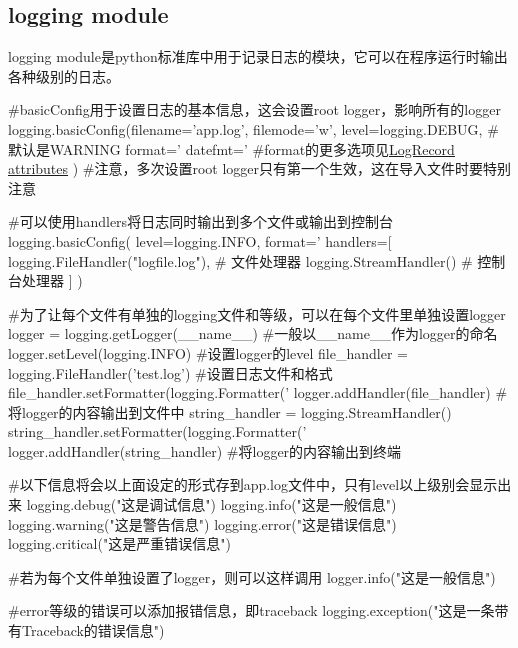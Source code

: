   \subsection{logging module}
    logging module是python标准库中用于记录日志的模块，它可以在程序运行时输出各种级别的日志。
    \begin{codeblock}[language=python, caption={logging module}]
      #basicConfig用于设置日志的基本信息，这会设置root logger，影响所有的logger
      logging.basicConfig(filename='app.log', filemode='w', 
                  level=logging.DEBUG, #默认是WARNING
                  format='%
                  datefmt='%
                      #format的更多选项见\href{https://docs.python.org/3/library/logging.html#logrecord-attributes}{\underline{LogRecord attributes}}
                  )
      #注意，多次设置root logger只有第一个生效，这在导入文件时要特别注意

      #可以使用handlers将日志同时输出到多个文件或输出到控制台
      logging.basicConfig(
          level=logging.INFO,
          format='%
          handlers=[
              logging.FileHandler("logfile.log"),   # 文件处理器
              logging.StreamHandler()               # 控制台处理器
          ]
      )

      #为了让每个文件有单独的logging文件和等级，可以在每个文件里单独设置logger
      logger = logging.getLogger(__name__) #一般以\_\_name\_\_作为logger的命名
      logger.setLevel(logging.INFO) #设置logger的level
      file_handler = logging.FileHandler('test.log') #设置日志文件和格式
      file_handler.setFormatter(logging.Formatter('%
      logger.addHandler(file_handler) #将logger的内容输出到文件中
      string_handler = logging.StreamHandler()
      string_handler.setFormatter(logging.Formatter('%
      logger.addHandler(string_handler) #将logger的内容输出到终端

      #以下信息将会以上面设定的形式存到app.log文件中，只有level以上级别会显示出来
      logging.debug("这是调试信息")
      logging.info("这是一般信息")
      logging.warning("这是警告信息")
      logging.error("这是错误信息")
      logging.critical("这是严重错误信息")

      #若为每个文件单独设置了logger，则可以这样调用
      logger.info("这是一般信息")

      #error等级的错误可以添加报错信息，即traceback
      logging.exception("这是一条带有Traceback的错误信息")
    \end{codeblock}

